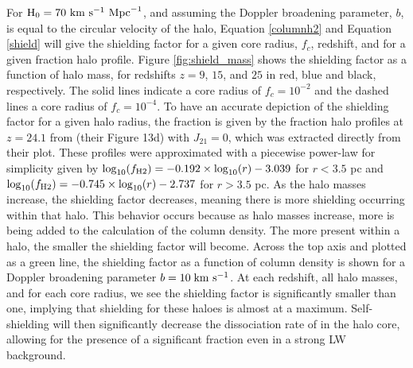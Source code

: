 \documentclass[fleqn,usenatbib]{mnras}
\begin{document}
For $\rm{H}_{0} = 70 \ \rm{km} \ \rm{s}^{-1} \ \rm{Mpc}^{-1}$, and assuming the Doppler broadening parameter, $b$, is equal to the circular velocity of the halo, Equation \ref{columnh2} and Equation \ref{shield} will give the shielding factor for a given core radius, $f_{c}$, redshift, and for a given \hh{} fraction halo profile. Figure \ref{fig:shield_mass} shows the shielding factor as a function of halo mass, for redshifts $z = 9$, $15$, and $25$ in red, blue and black, respectively. The solid lines indicate a core radius of $f_{c} = 10^{-2}$ and the dashed lines a core radius of $f_{c} = 10^{-4}$. To have an accurate depiction of the shielding factor for a given halo radius, the \hh{} fraction is given by the \hh{} fraction halo profiles at $z = 24.1$ from \citet{OShea08} (their Figure 13d) with $J_{21} = 0$, which was extracted directly from their plot. These profiles were approximated with a piecewise power-law for simplicity given by $\log_{10}(f_{\rm H2}) = -0.192 \times \log_{10}(r) - 3.039$ for $r < 3.5$ pc and $\log_{10}(f_{\rm H2}) = -0.745 \times \log_{10}(r) - 2.737$ for $r > 3.5$ pc. 
As the halo masses increase, the shielding factor decreases, meaning there is more shielding occurring within that halo. This behavior occurs because as halo masses increase, more \hh{} is being added to the calculation of the column density. The more \hh{} present within a halo, the smaller the shielding factor will become. Across the top axis and plotted as a green line, the shielding factor as a function of \hh{} column density is shown for a Doppler broadening parameter $ b = 10 \kms$. At each redshift, all halo masses, and for each core radius, we see the shielding factor is significantly smaller than one, implying that \hh{} shielding for these haloes is almost at a maximum. Self-shielding will then significantly decrease the dissociation rate of \hh{} in the halo core, allowing for the presence of a significant \hh{} fraction even in a strong LW background.
\end{document}
